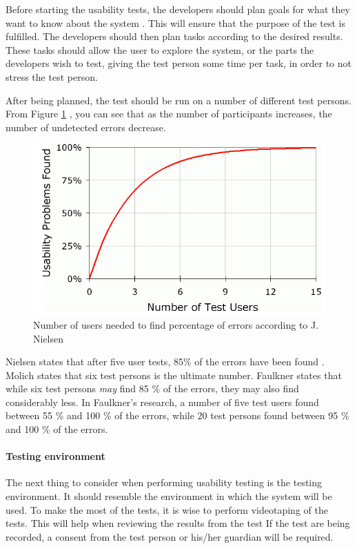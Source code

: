 Before starting the usability tests, the developers should plan goals for what they want to know about the system \cite{isosoftwareengineering}. This will ensure that the purpose of the test is fulfilled. The developers should then plan tasks according to the desired results. These tasks should allow the user to explore the system, or the parts the developers wish to test, giving the test person some time per task, in order to not stress the test person. 

After being planned, the test should be run on a number of different test persons. From Figure \ref{fig:numberoftests}
, you can see that as the number of participants increases, the number of undetected errors decrease. 



 \begin{figure}
 		\centering
 			\includegraphics[scale=0.4]{Pictures/app-screenshots/numberoftests.png}
 		\caption{Number of users needed to find percentage of errors according to J. Nielsen\cite{nielsennumberoftests}}
 		 		\label{fig:numberoftests}
 \end{figure}


Nielsen states that after five user tests, 85\% of the errors have been found \cite{nielsennumberoftests}. Molich\cite{molich2008usable} states that six test persons is the ultimate number. Faulkner \cite{faulkner2003beyond} states that while six test persons \textit{may} find 85 \% of the errors, they may also find considerably less. In Faulkner's research, a number of five test users found between 55 \% and 100 \% of the errors, while 20 test persons found between 95 \% and 100 \% of the errors. 

\paragraph{Testing environment}
\label{par:testingenvironment}
The next thing to consider when performing usability testing is the testing environment. It should resemble the environment in which the system will be used. To make the most of the tests, it is wise to perform videotaping of the tests. This will help when reviewing the results from the test If the test are being recorded, a consent from the test person or his/her guardian will be required.

